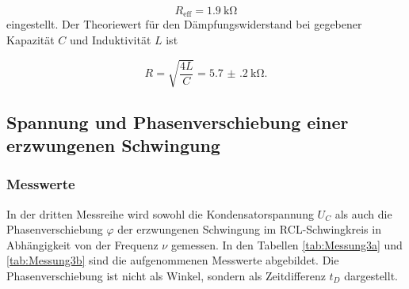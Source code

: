 \begin{equation}
  R_\text{eff} = \SI{1.9}{\kilo\ohm}
\end{equation}
eingestellt.
Der Theoriewert für den Dämpfungswiderstand bei gegebener Kapazität $C$ und
Induktivität $L$ ist

\begin{equation}
  R = \sqrt{\frac{4L}{C}} = \SI{5.7(2)}{\kilo\ohm}.
\end{equation}


\subsection{Spannung und Phasenverschiebung
einer erzwungenen Schwingung}

\subsubsection{Messwerte}

In der dritten Messreihe wird sowohl die Kondensatorspannung $U_C$ als auch die
Phasenverschiebung $\varphi$ der erzwungenen Schwingung im RCL-Schwingkreis in
Abhängigkeit von der Frequenz $\nu$ gemessen.
In den Tabellen \ref{tab:Messung3a} und \ref{tab:Messung3b}
sind die aufgenommenen Messwerte abgebildet.
Die Phasenverschiebung ist nicht als Winkel, sondern als Zeitdifferenz $t_D$
dargestellt.

